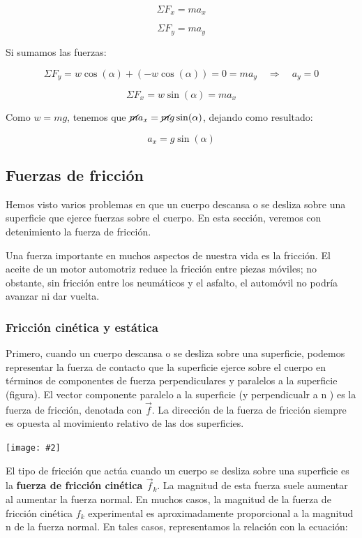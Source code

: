\documentclass{article}
\newcommand{\newsubsection}[1]{
    \vspace{0.5cm}
    \color{sectionColor}
    \subsection{\bl{#1}}
    \color{black}
    \vspace{0.5cm}
}
\newcommand{\newtitle}[1]{
    \color{titleColor}
    \subsubsection{#1}
    \color{black}
}
\newcommand{\bl}[1]{\textbf{#1}}
\newcommand{\ladoALado}[4]{
    \begin{minipage}[t]{#3\textwidth}
        \vspace{0pt}
        #1
    \end{minipage}
    \hfill
    \begin{minipage}[t]{#4\textwidth}
        \vspace{0pt}
        \centering
        \texttt{[image: \#2]}
    \end{minipage}
}
\begin{document}
    \[ \Sigma F_x = m a_x \]

    \[ \Sigma F_y = m a_y \]

    \par Si sumamos las fuerzas:

    \[ \Sigma F_y = w\cos(\alpha) + (-w\cos(\alpha)) = 0 = m a_y \quad \Longrightarrow  \quad a_y = 0 \]

    \[ \Sigma F_x = w\sin(\alpha) = m a_x \]

    \par Como $w = m g$, tenemos que $\cancel{m} a_x = \cancel{m} g \sin(\alpha)$, dejando como resultado:

    \[ a_x = g \sin(\alpha) \]

    \newsubsection{Fuerzas de fricción}

    \par Hemos visto varios problemas en que un cuerpo descansa o se desliza sobre una superficie que ejerce fuerzas sobre el cuerpo. En esta sección, veremos con detenimiento la fuerza de fricción.

    \par Una fuerza importante en muchos aspectos de nuestra vida es la fricción. El aceite de un motor automotriz reduce la fricción entre piezas móviles; no obstante, sin fricción entre los neumáticos y el asfalto, el automóvil no podría avanzar ni dar vuelta.

    \vspace{7cm}

    \newtitle{Fricción cinética y estática}

    \ladoALado{
        \par Primero, cuando un cuerpo descansa o se desliza sobre una superficie, podemos representar la fuerza de contacto que la superficie ejerce sobre el cuerpo en términos de componentes de fuerza perpendiculares y paralelos a la superficie (figura). El vector componente paralelo a la superficie (y perpendicualr a n ) es la fuerza de fricción, denotada con $\vec{f}$. La dirección de la fuerza de fricción siempre es opuesta al movimiento relativo de las dos superficies.
    }{img/3.3-1.png}{0.6}{0.4}

    \par El tipo de fricción que actúa cuando un cuerpo se desliza sobre una superficie es la \bl{fuerza de fricción cinética $\vec{f}_k$}. La magnitud de esta fuerza suele aumentar al aumentar la fuerza normal. En muchos casos, la magnitud de la fuerza de fricción cinética $f_k$ experimental es aproximadamente proporcional a la magnitud n de la fuerza normal. En tales casos, representamos la relación con la ecuación:
\end{document}
